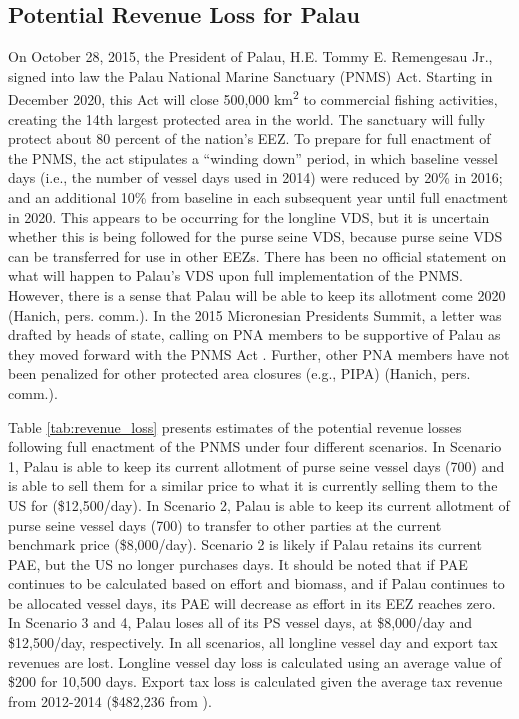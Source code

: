 \documentclass[9p,twocolumn,twoside,lineno]{pnas-new}
\begin{document}
\subsection{Potential Revenue Loss for Palau}

On October 28, 2015, the President of Palau, H.E. Tommy E. Remengesau Jr., signed into law the Palau National Marine Sanctuary (PNMS) Act. Starting in December 2020, this Act will close 500,000 km\textsuperscript{2} to commercial fishing activities, creating the 14th largest protected area in the world. The sanctuary will fully protect about 80 percent of the nation’s EEZ. To prepare for full enactment of the PNMS, the act stipulates a “winding down” period, in which baseline vessel days (i.e., the number of vessel days used in 2014) were reduced by 20\% in 2016; and an additional 10\% from baseline in each subsequent year until full enactment in 2020. This appears to be occurring for the longline VDS, but it is uncertain whether this is being followed for the purse seine VDS, because purse seine VDS can be transferred for use in other EEZs. There has been no official statement on what will happen to Palau’s VDS upon full implementation of the PNMS. However, there is a sense that Palau will be able to keep its allotment come 2020 (Hanich, pers. comm.). In the 2015 Micronesian Presidents Summit, a letter was drafted by heads of state, calling on PNA members to be supportive of Palau as they moved forward with the PNMS Act \cite{Senase2015}. Further, other PNA members have not been penalized for other protected area closures (e.g., PIPA) (Hanich, pers. comm.).

Table \ref{tab:revenue_loss} presents estimates of the potential revenue losses following full enactment of the PNMS under four different scenarios. In Scenario 1, Palau is able to keep its current allotment of purse seine vessel days (700) and is able to sell them for a similar price to what it is currently selling them to the US for (\$12,500/day). In Scenario 2, Palau is able to keep its current allotment of purse seine vessel days (700) to transfer to other parties at the current benchmark price (\$8,000/day). Scenario 2 is likely if Palau retains its current PAE, but the US no longer purchases days.  It should be noted that if PAE continues to be calculated based on effort and biomass, and if Palau continues to be allocated vessel days, its PAE will decrease as effort in its EEZ reaches zero. In Scenario 3 and 4, Palau loses all of its PS vessel days, at \$8,000/day and \$12,500/day, respectively. In all scenarios, all longline vessel day and export tax revenues are lost. Longline vessel day loss is calculated using an average value of \$200 for 10,500 days. Export tax loss is calculated given the average tax revenue from 2012-2014 (\$482,236  from \cite{Gillett2016}). 
\end{document}
